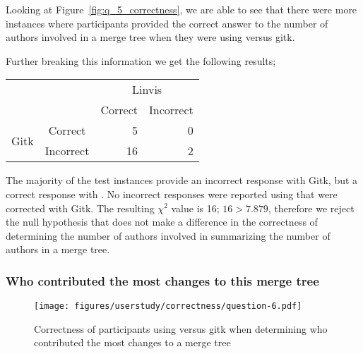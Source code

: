 Looking at Figure~\ref{fig:q_5_correctness}, we are able to see that
there were more instances where participants provided the correct answer
to the number of authors involved in a merge tree when they were using
\tool versus gitk.


Further breaking this information we get the following results;




\begin{center}
  \begin{tabular}{cc|rr}
                           &           & \multicolumn{2}{c}{Linvis}\\
                           &           & Correct                      & Incorrect\\\hline
    \multirow{2}{*}{Gitk}  & Correct   & 5                            & 0\\
                           & Incorrect & 16                           & 2\\
  \end{tabular}
\end{center}

The majority of the test instances provide an incorrect response with
Gitk, but a correct response with \tool. No incorrect responses were
reported using \tool that were corrected with Gitk. The resulting
$\chi^2$ value is 16; $16 > 7.879$, therefore we reject the null
hypothesis that \tool does not make a difference in the correctness of
determining the number of authors involved in summarizing the number of
authors in a merge tree.


\subsubsection{Who contributed the most changes to this merge tree}
\label{ssub:who_contributed_the_most_changes_to_this_merge_tree}

\begin{figure}[htpb]
  \centering
  \texttt{[image: figures/userstudy/correctness/question-6.pdf]}
  \caption{Correctness of participants using \tool versus gitk when
    determining who contributed the most changes to a merge tree}
  \label{fig:q_6_correctness}
\end{figure}

